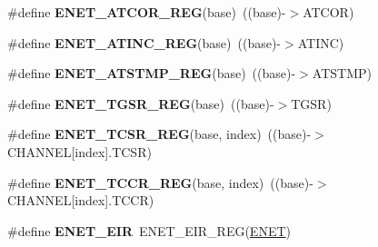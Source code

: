 \begin{DoxyCompactItemize}
\item 
\#define {\bfseries E\+N\+E\+T\+\_\+\+A\+T\+C\+O\+R\+\_\+\+R\+EG}(base)~((base)-\/$>$A\+T\+C\+OR)\hypertarget{group__ENET__Register__Accessor__Macros_ga42a0c4d158ce03b9d9afc0999d24aeeb}{}\label{group__ENET__Register__Accessor__Macros_ga42a0c4d158ce03b9d9afc0999d24aeeb}

\item 
\#define {\bfseries E\+N\+E\+T\+\_\+\+A\+T\+I\+N\+C\+\_\+\+R\+EG}(base)~((base)-\/$>$A\+T\+I\+NC)\hypertarget{group__ENET__Register__Accessor__Macros_gab66143cd1e00b4a17ef6454405569e85}{}\label{group__ENET__Register__Accessor__Macros_gab66143cd1e00b4a17ef6454405569e85}

\item 
\#define {\bfseries E\+N\+E\+T\+\_\+\+A\+T\+S\+T\+M\+P\+\_\+\+R\+EG}(base)~((base)-\/$>$A\+T\+S\+T\+MP)\hypertarget{group__ENET__Register__Accessor__Macros_gaf1c3457b86836cea7c5db5caab1ef16f}{}\label{group__ENET__Register__Accessor__Macros_gaf1c3457b86836cea7c5db5caab1ef16f}

\item 
\#define {\bfseries E\+N\+E\+T\+\_\+\+T\+G\+S\+R\+\_\+\+R\+EG}(base)~((base)-\/$>$T\+G\+SR)\hypertarget{group__ENET__Register__Accessor__Macros_ga79be8d28317c618cee68253311e225c0}{}\label{group__ENET__Register__Accessor__Macros_ga79be8d28317c618cee68253311e225c0}

\item 
\#define {\bfseries E\+N\+E\+T\+\_\+\+T\+C\+S\+R\+\_\+\+R\+EG}(base,  index)~((base)-\/$>$C\+H\+A\+N\+N\+EL\mbox{[}index\mbox{]}.T\+C\+SR)\hypertarget{group__ENET__Register__Accessor__Macros_gaa0c9a6934bdfa86ee962fba93d4b50bf}{}\label{group__ENET__Register__Accessor__Macros_gaa0c9a6934bdfa86ee962fba93d4b50bf}

\item 
\#define {\bfseries E\+N\+E\+T\+\_\+\+T\+C\+C\+R\+\_\+\+R\+EG}(base,  index)~((base)-\/$>$C\+H\+A\+N\+N\+EL\mbox{[}index\mbox{]}.T\+C\+CR)\hypertarget{group__ENET__Register__Accessor__Macros_ga0ab126f7e9588ab314c57396882fe1a5}{}\label{group__ENET__Register__Accessor__Macros_ga0ab126f7e9588ab314c57396882fe1a5}

\item 
\#define {\bfseries E\+N\+E\+T\+\_\+\+E\+IR}~E\+N\+E\+T\+\_\+\+E\+I\+R\+\_\+\+R\+EG(\hyperlink{group__ENET__Peripheral__Access__Layer_ga4745105f505f3ab949d6a57fbe2a0ed5}{E\+N\+ET})\hypertarget{group__ENET__Register__Accessor__Macros_ga4bbc86df12f271cea45cda0f6384d344}{}\label{group__ENET__Register__Accessor__Macros_ga4bbc86df12f271cea45cda0f6384d344}


\end{DoxyCompactItemize}
